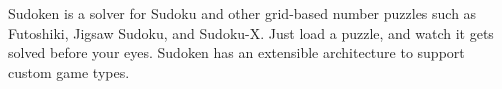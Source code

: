 \noindent
Sudoken is a solver for Sudoku and other grid-based number puzzles such as Futoshiki, Jigsaw Sudoku, and Sudoku-X. Just load a puzzle, and watch it gets solved before your eyes. Sudoken has an extensible architecture to support custom game types.
